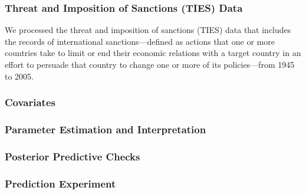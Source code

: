 \documentclass[12pt]{article}
\begin{document}
\subsubsection{Threat and Imposition of Sanctions (TIES) Data}\label{subsubsec:TIES}
We processed the threat and imposition of sanctions (TIES) data \citep{morgan2014threat} that includes the records of international sanctions---defined as actions that one or more countries take to limit or end their economic relations with a target country in an effort to persuade that country to change one or more of its policies---from 1945 to 2005.
\subsubsection{Covariates}\label{subsec:Covariates_sanction}
\subsubsection{Parameter Estimation and Interpretation}\label{subsubsec:Result_sanction}
	\subsubsection{Posterior Predictive Checks}\label{subsubsec:PPC_sanction} 	 
		\subsubsection{Prediction Experiment}\label{subsubsec:Experiment_sanction} 
		\fi 
\end{document}
